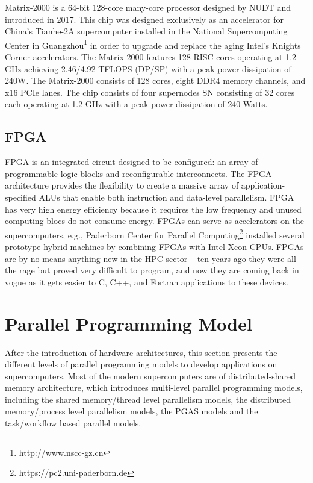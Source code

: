 Matrix-2000 \cite{matrix-2000} is a 64-bit 128-core many-core processor designed by NUDT and introduced in 2017. This chip was designed exclusively as an accelerator for China's Tianhe-2A supercomputer installed in the National Supercomputing Center in Guangzhou\footnote{http://www.nscc-gz.cn} in order to upgrade and replace the aging Intel's Knights Corner accelerators. The Matrix-2000 features 128 RISC cores operating at 1.2 GHz achieving 2.46/4.92 TFLOPS (DP/SP) with a peak power dissipation of 240W. The Matrix-2000 consists of 128 cores, eight DDR4 memory channels, and x16 PCIe lanes. The chip consists of four supernodes SN consisting of 32 cores each operating at 1.2 GHz with a peak power dissipation of 240 Watts.

\subsection{FPGA}

FPGA is an integrated circuit designed to be configured: an array of programmable logic blocks and reconfigurable interconnects. The FPGA architecture provides the flexibility to create a massive array of application-specified ALUs that enable both instruction and data-level parallelism. FPGA has very high energy efficiency because it requires the low frequency and unused computing blocs do not consume energy. FPGAs can serve as accelerators on the supercomputers, e.g., Paderborn Center for Parallel Computing\footnote{https://pc2.uni-paderborn.de} installed several prototype hybrid machines by combining FPGAs with Intel Xeon CPUs. FPGAs are by no means anything new in the HPC sector – ten years ago they were all the rage but proved very difficult to program, and now they are coming back in vogue as it gets easier to C, C++, and Fortran applications to these devices.


\section{Parallel Programming Model}\label{Parallel Programming Model}

After the introduction of hardware architectures, this section presents the different levels of parallel programming models to develop applications on supercomputers. Most of the modern supercomputers are of distributed-shared memory architecture, which introduces multi-level parallel programming models, including the shared memory/thread level parallelism models, the distributed memory/process level parallelism models, the PGAS models and the task/workflow based parallel models.

